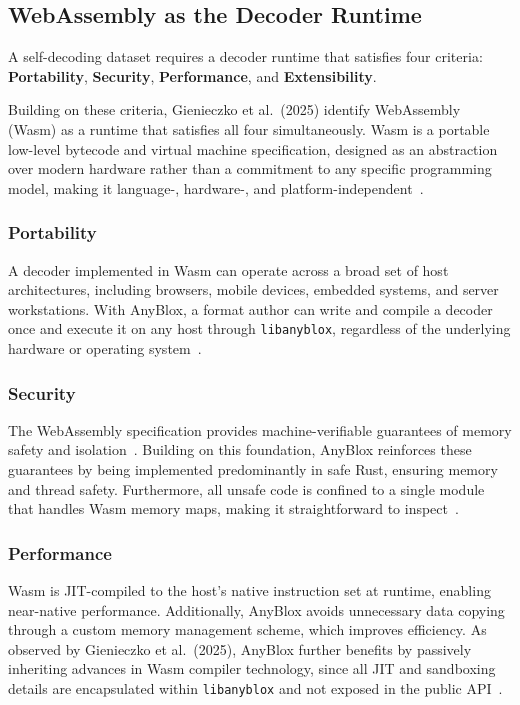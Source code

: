\subsection{WebAssembly as the Decoder Runtime}

A self-decoding dataset requires a decoder runtime that satisfies four criteria: \textbf{Portability}, \textbf{Security}, \textbf{Performance}, and \textbf{Extensibility}.

Building on these criteria, Gienieczko et al.\ (2025) identify WebAssembly (Wasm) as a runtime that satisfies all four simultaneously. Wasm is a portable low-level bytecode and virtual machine specification, designed as an abstraction over modern hardware rather than a commitment to any specific programming model, making it language-, hardware-, and platform-independent~\cite{haasBringingWebSpeed2017}.

\subsubsection{Portability}

A decoder implemented in Wasm can operate across a broad set of host architectures, including browsers, mobile devices, embedded systems, and server workstations. With AnyBlox, a format author can write and compile a decoder once and execute it on any host through \texttt{libanyblox}, regardless of the underlying hardware or operating system~\cite{gienieczkoAnyBloxFrameworkSelfDecoding2025}.

\subsubsection{Security}

The WebAssembly specification provides machine-verifiable guarantees of memory safety and isolation~\cite{wattMechanisingVerifyingWebAssembly2018}. Building on this foundation, AnyBlox reinforces these guarantees by being implemented predominantly in safe Rust, ensuring memory and thread safety. Furthermore, all unsafe code is confined to a single module that handles Wasm memory maps, making it straightforward to inspect~\cite{gienieczkoAnyBloxFrameworkSelfDecoding2025}.

\subsubsection{Performance}

Wasm is JIT-compiled to the host's native instruction set at runtime, enabling near-native performance. Additionally, AnyBlox avoids unnecessary data copying through a custom memory management scheme, which improves efficiency. As observed by Gienieczko et al.\ (2025), AnyBlox further benefits by passively inheriting advances in Wasm compiler technology, since all JIT and sandboxing details are encapsulated within \texttt{libanyblox} and not exposed in the public API~\cite{gienieczkoAnyBloxFrameworkSelfDecoding2025}.

